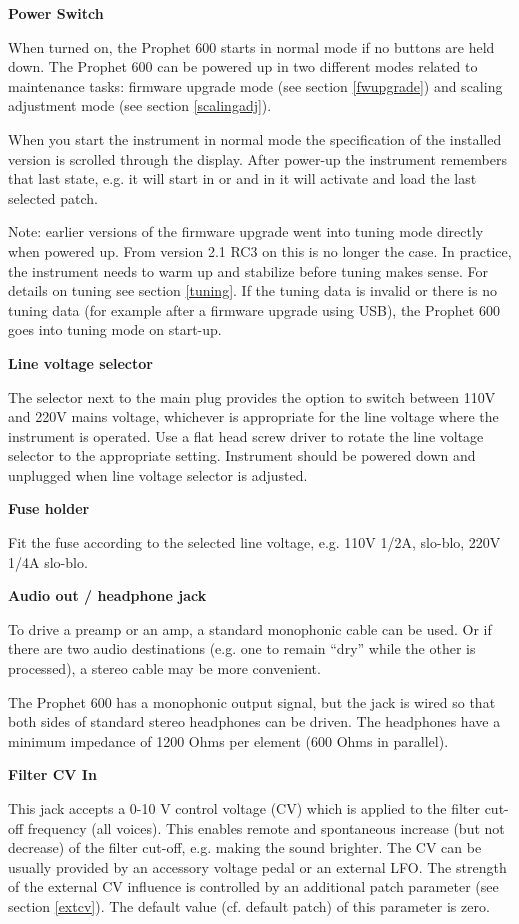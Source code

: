\textbf{Power Switch}

When turned on, the Prophet 600 starts in normal mode if no buttons are held down. The Prophet 600 can be powered up in two different modes related to maintenance tasks: firmware upgrade mode (see section \ref{fwupgrade}) and scaling adjustment mode (see section \ref{scalingadj}).  

When you start the instrument in normal mode the specification of the installed version is scrolled through the display. After power-up the instrument remembers that last state, e.g. it will start in \livemode or \presetmode and in \presetmode it will activate and load the last selected patch.

Note: earlier versions of the firmware upgrade went into tuning mode directly when powered up. From version 2.1 RC3 on this is no longer the case. In practice, the instrument needs to warm up and stabilize before tuning makes sense. For details on tuning see section \ref{tuning}. If the tuning data is invalid or there is no tuning data (for example after a firmware upgrade using USB), the Prophet 600 goes into tuning mode on start-up.

\textbf{Line voltage selector}

The selector next to the main plug provides the option to switch between 110V and 220V mains voltage, whichever is appropriate for the line voltage where the instrument is operated. Use a flat head screw driver to rotate the line voltage selector to the appropriate setting. Instrument should be powered down and unplugged when line voltage selector is adjusted.

\textbf{Fuse holder}

Fit the fuse according to the selected line voltage, e.g. 110V 1/2A, slo-blo, 220V 1/4A slo-blo.

\textbf{Audio out / headphone jack}

To drive a preamp or an amp, a standard monophonic cable can be used. Or if there are two audio destinations (e.g. one to remain “dry” while the other is processed), a stereo cable may be more convenient.

The Prophet 600 has a monophonic output signal, but the jack is wired so that both sides of standard stereo headphones can be driven. The headphones have a minimum impedance of 1200 Ohms per element (600 Ohms in parallel).

\textbf{Filter CV In}

This jack accepts a 0-10 V control voltage (CV) which is applied to the filter cut-off frequency (all voices). This enables remote and spontaneous increase (but not decrease) of the filter cut-off, e.g. making the sound brighter. The CV can be usually provided by an accessory voltage pedal or an external LFO. The strength of the external CV influence is controlled by an additional patch parameter (see section \ref{extcv}). The default value (cf. default patch) of this parameter is zero. 

